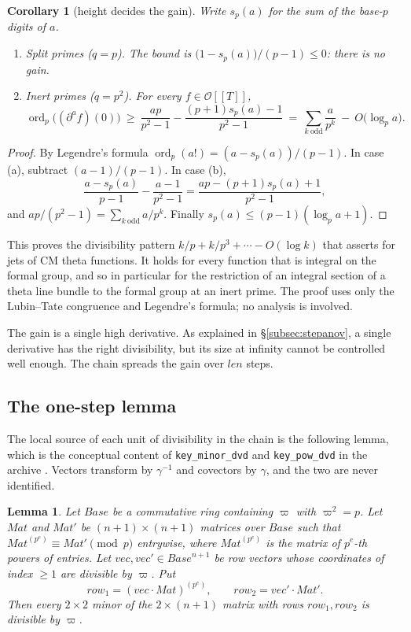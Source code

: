 \documentclass[11pt]{amsart}
\newtheorem{lemma}[theorem]{Lemma}
\newtheorem{corollary}[theorem]{Corollary}
\theoremstyle{definition}
\theoremstyle{remark}
\newcommand{\len}{\mathit{len}}
\newcommand{\Base}{\mathit{Base}}
\newcommand{\Mat}{\mathit{Mat}}
\newcommand{\vect}{\mathit{vec}}
\newcommand{\row}{\mathit{row}}
\DeclareMathOperator{\ord}{ord}
\begin{document}
\begin{corollary}[height decides the gain]\label{cor:height}
Write $s_p(a)$ for the sum of the base-$p$ digits of $a$.
\begin{enumerate}[label=(\alph*)]
\item \emph{Split primes} ($q=p$). The bound is $\bigl(1-s_p(a)\bigr)/(p-1)\le0$: there is no gain.
\item \emph{Inert primes} ($q=p^2$). For every $f\in\mathcal O[[T]]$,
\[
\ord_p\bigl((\partial^af)(0)\bigr)\ \ge\ \frac{ap}{p^2-1}-\frac{(p+1)s_p(a)-1}{p^2-1}
\ =\ \sum_{k\ \mathrm{odd}}\frac{a}{p^k}\ -\ O\bigl(\log_p a\bigr).
\]
\end{enumerate}
\end{corollary}

\begin{proof}
By Legendre's formula $\ord_p(a!)=(a-s_p(a))/(p-1)$. In case (a), subtract $(a-1)/(p-1)$. In case (b),
\[
\frac{a-s_p(a)}{p-1}-\frac{a-1}{p^2-1}=\frac{ap-(p+1)s_p(a)+1}{p^2-1},
\]
and $ap/(p^2-1)=\sum_{k\ \mathrm{odd}}a/p^{k}$. Finally $s_p(a)\le(p-1)(\log_pa+1)$.
\end{proof}

This proves the divisibility pattern $k/p+k/p^3+\cdots-O(\log k)$ that \cite{nasqret} asserts for jets of CM theta functions. It holds for every function that is integral on the formal group, and so in particular for the restriction of an integral section of a theta line bundle to the formal group at an inert prime. The proof uses only the Lubin--Tate congruence and Legendre's formula; no analysis is involved.

The gain is a single high derivative. As explained in \S\ref{subsec:stepanov}, a single derivative has the right divisibility, but its size at infinity cannot be controlled well enough. The chain spreads the gain over $\len$ steps.

\subsection{The one-step lemma}
The local source of each unit of divisibility in the chain is the following lemma, which is the conceptual content of \texttt{key\_minor\_dvd} and \texttt{key\_pow\_dvd} in the archive \cite{golf}. Vectors transform by $\gamma^{-1}$ and covectors by $\gamma$, and the two are never identified.

\begin{lemma}\label{lem:minor}
Let $\Base$ be a commutative ring containing $\varpi$ with $\varpi^2=p$. Let $\Mat$ and $\Mat'$ be $(n+1)\times(n+1)$ matrices over $\Base$ such that $\Mat^{(p^e)}\equiv\Mat'\pmod{p}$ entrywise, where $\Mat^{(p^e)}$ is the matrix of $p^e$-th powers of entries. Let $\vect,\vect'\in\Base^{n+1}$ be row vectors whose coordinates of index $\ge1$ are divisible by $\varpi$. Put
\[
\row_1=(\vect\cdot\Mat)^{(p^e)},\qquad \row_2=\vect'\cdot\Mat' .
\]
Then every $2\times2$ minor of the $2\times(n+1)$ matrix with rows $\row_1,\row_2$ is divisible by $\varpi$.
\end{lemma}
\end{document}
